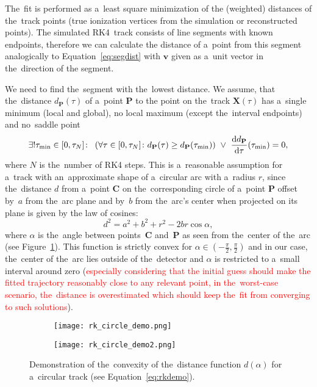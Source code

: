 		The~fit is performed as a~least square minimization of the (weighted) distances of the~track points (true ionization vertices from the simulation or reconstructed points). The simulated \ac{RK4}~track consists of line segments with known endpoints, therefore we can calculate the distance of a~point from this segment analogically to Equation~\ref{eq:segdist} with $\mathbf{v}$ given as a~unit vector in the~direction of the segment.
		
		We need to find the~segment with the~lowest distance. We assume, that the~distance $d_\mathbf{P}(\tau)$ of a~point $\mathbf{P}$ to the point on the~track $\mathbf{X}(\tau)$ has a~single minimum (local and global), no local maximum (except the~interval endpoints) and no~saddle point
			\begin{equation}
				\label{eq:rk_assum}
				\exists!\tau_\text{min}\in[0,\tau_N]\colon\ \left(\forall\tau\in[0,\tau_N]\colon  d_{\mathbf{P}}(\tau) \geq d_{\mathbf{P}}(\tau_\text{min})\right)\ \lor\ \dv{d_{\mathbf{P}}}{\tau}{(\tau_\text{min})} = 0,
			\end{equation}
		where $N$ is the~number of \ac{RK4} steps. This is a~reasonable assumption for a~track with an~approximate shape of a~circular arc with a~radius $r$, since the~distance $d$ from a~point $\mathbf{C}$ on the~corresponding circle of a~point $\mathbf{P}$ offset by~$a$ from the~arc plane and by~$b$ from the~arc's center when projected on its plane is given by the law of cosines:
			\begin{equation}
				\label{eq:rkdemo}
				d^2 = a^2+b^2+r^2 - 2br\cos\alpha,
			\end{equation}
		where $\alpha$ is the~angle between points~$\mathbf{C}$ and~$\mathbf{P}$ as seen from the~center of the~arc (see Figure~\ref{fig:rkdemo}). This function is strictly convex for $\alpha\in\left(-\frac{\pi}{2},\frac{\pi}{2}\right)$ and in our case, the~center of the~arc lies outside of the~detector and $\alpha$ is restricted to a~small interval around zero (\textcolor{red}{especially considering that the initial guess should make the fitted trajectory reasonably close to any relevant point, in the~worst-case scenario, the~distance is overestimated which should keep the~fit from converging to such solutions}).
		
		\begin{figure}
			\centering
			\begin{subfigure}[t]{0.7\textwidth}
				\centering
				\texttt{[image: rk\_circle\_demo.png]}
			\end{subfigure}
			\hfill
			\begin{subfigure}[t]{0.29\textwidth}
				\centering
				\texttt{[image: rk\_circle\_demo2.png]}
			\end{subfigure}
			\caption{Demonstration of the~convexity of the~distance function $d(\alpha)$ for a~circular track (see Equation~\ref{eq:rkdemo}).}
			\label{fig:rkdemo}
		\end{figure}
		
